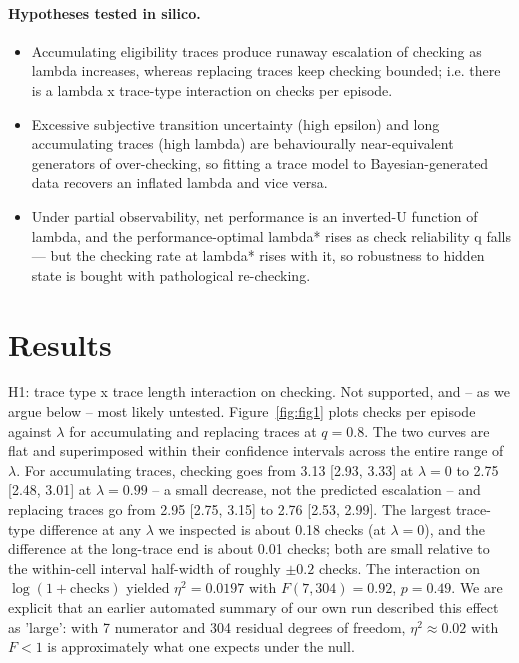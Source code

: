 \documentclass[11pt,a4paper]{article}
\begin{document}
\paragraph{Hypotheses tested in silico.}
\begin{itemize}
  \item[\textbf{H1}] Accumulating eligibility traces produce runaway escalation of checking as lambda increases, whereas replacing traces keep checking bounded; i.e. there is a lambda x trace-type interaction on checks per episode.
  \item[\textbf{H2}] Excessive subjective transition uncertainty (high epsilon) and long accumulating traces (high lambda) are behaviourally near-equivalent generators of over-checking, so fitting a trace model to Bayesian-generated data recovers an inflated lambda and vice versa.
  \item[\textbf{H3}] Under partial observability, net performance is an inverted-U function of lambda, and the performance-optimal lambda* rises as check reliability q falls — but the checking rate at lambda* rises with it, so robustness to hidden state is bought with pathological re-checking.
\end{itemize}
\section{Results}
H1: trace type x trace length interaction on checking. Not supported, and -- as we argue below -- most likely untested. Figure~\ref{fig:fig1} plots checks per episode against $\lambda$ for accumulating and replacing traces at $q=0.8$. The two curves are flat and superimposed within their confidence intervals across the entire range of $\lambda$. For accumulating traces, checking goes from 3.13 [2.93, 3.33] at $\lambda=0$ to 2.75 [2.48, 3.01] at $\lambda=0.99$ -- a small decrease, not the predicted escalation -- and replacing traces go from 2.95 [2.75, 3.15] to 2.76 [2.53, 2.99]. The largest trace-type difference at any $\lambda$ we inspected is about 0.18 checks (at $\lambda=0$), and the difference at the long-trace end is about 0.01 checks; both are small relative to the within-cell interval half-width of roughly $\pm 0.2$ checks. The interaction on $\log(1+\text{checks})$ yielded $\eta^2 = 0.0197$ with $F(7,304) = 0.92$, $p = 0.49$. We are explicit that an earlier automated summary of our own run described this effect as 'large': with 7 numerator and 304 residual degrees of freedom, $\eta^2 \approx 0.02$ with $F < 1$ is approximately what one expects under the null.
\end{document}
